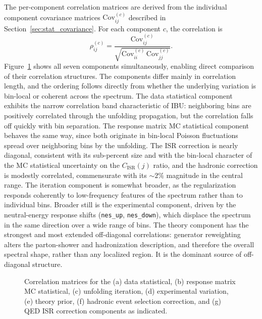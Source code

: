 The per-component correlation matrices are derived from the individual component covariance matrices $\mathrm{Cov}^{(c)}_{ij}$ described in
Section~\ref{sec:stat_covariance}. For each component $c$, the correlation is 
\begin{equation}
\rho^{(c)}_{ij} = \frac{\mathrm{Cov}^{(c)}_{ij}}{\sqrt{\mathrm{Cov}^{(c)}_{ii}\,\mathrm{Cov}^{(c)}_{jj}}}.
\end{equation}
Figure~\ref{fig:corr_matrices_per_source} shows all seven components simultaneously, enabling direct comparison of their correlation structures. The components differ mainly in correlation length, and the ordering follows directly from whether the underlying variation is bin-local or coherent across the spectrum. The data statistical component exhibits the narrow correlation band characteristic of IBU: neighboring bins are positively correlated through the unfolding propagation, but the correlation falls off quickly with bin separation. The response matrix MC statistical component behaves the same way, since both originate in bin-local Poisson fluctuations spread over neighboring bins by the unfolding. The ISR correction is nearly diagonal, consistent with its sub-percent size and with the bin-local character of the MC statistical uncertainty on the $C_{\mathrm{ISR}}(j)$ ratio, and the hadronic correction is modestly correlated, commensurate with its ${\sim}2\%$ magnitude in the central range. The iteration component is somewhat broader, as the regularization responds coherently to low-frequency features of the spectrum rather than to individual bins. Broader still is the experimental component, driven by the neutral-energy response shifts (\texttt{nes\_up}, \texttt{nes\_down}), which displace the spectrum in the
same direction over a wide range of bins. The theory component has the strongest and most extended off-diagonal correlations: generator reweighting alters the parton-shower and hadronization description, and therefore the overall spectral shape, rather than any localized
region. It is the dominant source of off-diagonal structure.

\begin{figure}[ht!]
\centering
{}
 \hfill
\vspace{0.5em}
 \hfill
\vspace{0.5em}
\caption{Correlation matrices for the (a) data statistical, (b) response matrix MC statistical, (c) unfolding iteration, (d) experimental variation, (e) theory prior, (f) hadronic event selection correction, and (g) QED ISR correction components as indicated.}
\label{fig:corr_matrices_per_source}
\end{figure}
